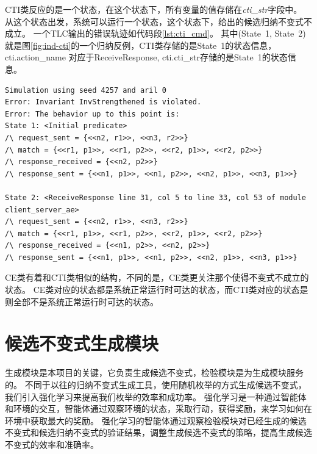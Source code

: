 CTI类反应的是一个状态，在这个状态下，所有变量的值存储在\textit{cti\_str}字段中。
从这个状态出发，系统可以运行一个状态，这个状态下，给出的候选归纳不变式不成立。
一个TLC输出的错误轨迹如代码段\ref{lst:cti_cmd}。
其中(State\ 1, State\ 2)就是图\ref{fig:ind-cti}的一个归纳反例，CTI类存储的是State\ 1的状态信息，cti.action\_name 对应于ReceiveResponse,
cti.cti\_str存储的是State\ 1的状态信息。

\begin{lstlisting}[caption={反例的命令行输出}, label={lst:cti_cmd}]
Simulation using seed 4257 and aril 0
Error: Invariant InvStrengthened is violated.
Error: The behavior up to this point is:
State 1: <Initial predicate>
/\ request_sent = {<<n2, r1>>, <<n3, r2>>}
/\ match = {<<r1, p1>>, <<r1, p2>>, <<r2, p1>>, <<r2, p2>>}
/\ response_received = {<<n2, p2>>}
/\ response_sent = {<<n1, p1>>, <<n1, p2>>, <<n2, p1>>, <<n3, p1>>}

State 2: <ReceiveResponse line 31, col 5 to line 33, col 53 of module client_server_ae>
/\ request_sent = {<<n2, r1>>, <<n3, r2>>}
/\ match = {<<r1, p1>>, <<r1, p2>>, <<r2, p1>>, <<r2, p2>>}
/\ response_received = {<<n1, p2>>, <<n2, p2>>}
/\ response_sent = {<<n1, p1>>, <<n1, p2>>, <<n2, p1>>, <<n3, p1>>}	
\end{lstlisting}

CE类有着和CTI类相似的结构，不同的是，CE类更关注那个使得不变式不成立的状态。
CE类对应的状态都是系统正常运行时可达的状态，而CTI类对应的状态是则全部不是系统正常运行时可达的状态。


\section{候选不变式生成模块}

生成模块是本项目的关键，它负责生成候选不变式，检验模块是为生成模块服务的。
不同于以往的归纳不变式生成工具，使用随机枚举的方式生成候选不变式，我们引入强化学习来提高我们枚举的效率和成功率。
强化学习是一种通过智能体和环境的交互，智能体通过观察环境的状态，采取行动，获得奖励，来学习如何在环境中获取最大的奖励。
强化学习的智能体通过观察检验模块对已经生成的候选不变式和候选归纳不变式的验证结果，调整生成候选不变式的策略，提高生成候选不变式的效率和准确率。

